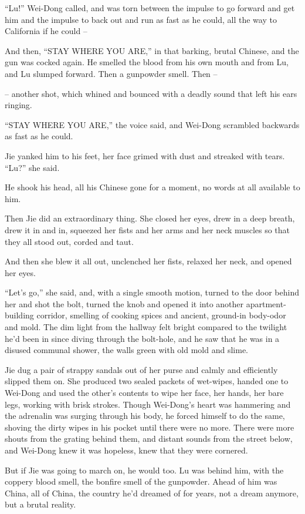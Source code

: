 ``Lu!'' Wei-Dong called, and was torn between the impulse to go
forward and get him and the impulse to back out and run as fast as
he could, all the way to California if he could --

And then, ``STAY WHERE YOU ARE,'' in that barking, brutal Chinese,
and the gun was cocked again. He smelled the blood from his own
mouth and from Lu, and Lu slumped forward. Then a gunpowder smell.
Then --

-- another shot, which whined and bounced with a deadly sound that
left his ears ringing.

``STAY WHERE YOU ARE,'' the voice said, and Wei-Dong scrambled
backwards as fast as he could.

Jie yanked him to his feet, her face grimed with dust and streaked
with tears. ``Lu?'' she said.

He shook his head, all his Chinese gone for a moment, no words at
all available to him.

Then Jie did an extraordinary thing. She closed her eyes, drew in a
deep breath, drew it in and in, squeezed her fists and her arms and
her neck muscles so that they all stood out, corded and taut.

And then she blew it all out, unclenched her fists, relaxed her
neck, and opened her eyes.

``Let's go,'' she said, and, with a single smooth motion, turned to
the door behind her and shot the bolt, turned the knob and opened
it into another apartment-building corridor, smelling of cooking
spices and ancient, ground-in body-odor and mold. The dim light
from the hallway felt bright compared to the twilight he'd been in
since diving through the bolt-hole, and he saw that he was in a
disused communal shower, the walls green with old mold and slime.

Jie dug a pair of strappy sandals out of her purse and calmly and
efficiently slipped them on. She produced two sealed packets of
wet-wipes, handed one to Wei-Dong and used the other's contents to
wipe her face, her hands, her bare legs, working with brisk
strokes. Though Wei-Dong's heart was hammering and the adrenalin
was surging through his body, he forced himself to do the same,
shoving the dirty wipes in his pocket until there were no more.
There were more shouts from the grating behind them, and distant
sounds from the street below, and Wei-Dong knew it was hopeless,
knew that they were cornered.

But if Jie was going to march on, he would too. Lu was behind him,
with the coppery blood smell, the bonfire smell of the gunpowder.
Ahead of him was China, all of China, the country he'd dreamed of
for years, not a dream anymore, but a brutal reality.

